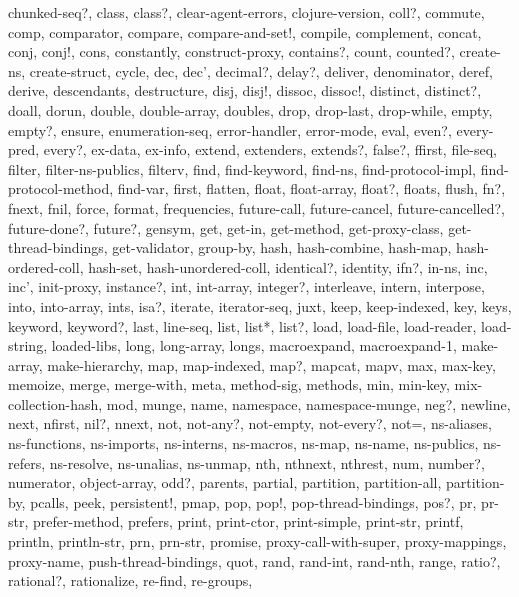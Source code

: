 {{    chunked-seq?, class, class?, clear-agent-errors, clojure-version, coll?, %
    commute, comp, comparator, compare, compare-and-set!, compile, complement, %
    concat, conj, conj!, cons, constantly, construct-proxy, contains?, count, %
    counted?, create-ns, create-struct, cycle, dec, dec', decimal?, delay?, %
    deliver, denominator, deref, derive, descendants, destructure, disj, disj!, %
    dissoc, dissoc!, distinct, distinct?, doall, dorun, double, double-array, %
    doubles, drop, drop-last, drop-while, empty, empty?, ensure, %
    enumeration-seq, error-handler, error-mode, eval, even?, every-pred, every?, %
    ex-data, ex-info, extend, extenders, extends?, false?, ffirst, file-seq, %
    filter, filter-ns-publics, filterv, find, find-keyword, find-ns, %
    find-protocol-impl, find-protocol-method, find-var, first, flatten, float, %
    float-array, float?, floats, flush, fn?, fnext, fnil, force, format, %
    frequencies, future-call, future-cancel, future-cancelled?, future-done?, %
    future?, gensym, get, get-in, get-method, get-proxy-class, %
    get-thread-bindings, get-validator, group-by, hash, hash-combine, hash-map, %
    hash-ordered-coll, hash-set, hash-unordered-coll, identical?, identity, %
    ifn?, in-ns, inc, inc', init-proxy, instance?, int, int-array, integer?, %
    interleave, intern, interpose, into, into-array, ints, isa?, iterate, %
    iterator-seq, juxt, keep, keep-indexed, key, keys, keyword, keyword?, last, %
    line-seq, list, list*, list?, load, load-file, load-reader, load-string, %
    loaded-libs, long, long-array, longs, macroexpand, macroexpand-1, %
    make-array, make-hierarchy, map, map-indexed, map?, mapcat, mapv, max, %
    max-key, memoize, merge, merge-with, meta, method-sig, methods, min, %
    min-key, mix-collection-hash, mod, munge, name, namespace, namespace-munge, %
    neg?, newline, next, nfirst, nil?, nnext, not, not-any?, not-empty, %
    not-every?, not=, ns-aliases, ns-functions, ns-imports, ns-interns, %
    ns-macros, ns-map, ns-name, ns-publics, ns-refers, ns-resolve, ns-unalias, %
    ns-unmap, nth, nthnext, nthrest, num, number?, numerator, object-array, %
    odd?, parents, partial, partition, partition-all, partition-by, pcalls, %
    peek, persistent!, pmap, pop, pop!, pop-thread-bindings, pos?, pr, pr-str, %
    prefer-method, prefers, print, print-ctor, print-simple, print-str, printf, %
    println, println-str, prn, prn-str, promise, proxy-call-with-super, %
    proxy-mappings, proxy-name, push-thread-bindings, quot, rand, rand-int, %
    rand-nth, range, ratio?, rational?, rationalize, re-find, re-groups, %
}}
